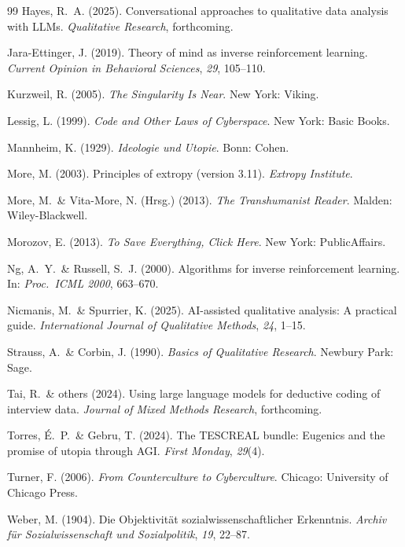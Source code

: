 \documentclass[12pt,a4paper]{article}
\begin{document}
\begin{thebibliography}{99}
  Hayes, R.~A. (2025).
  Conversational approaches to qualitative data analysis with LLMs.
  \textit{Qualitative Research}, forthcoming.

  Jara-Ettinger, J. (2019).
  Theory of mind as inverse reinforcement learning.
  \textit{Current Opinion in Behavioral Sciences}, \textit{29}, 105--110.

  Kurzweil, R. (2005).
  \textit{The Singularity Is Near}.
  New York: Viking.

  Lessig, L. (1999).
  \textit{Code and Other Laws of Cyberspace}.
  New York: Basic Books.

  Mannheim, K. (1929).
  \textit{Ideologie und Utopie}.
  Bonn: Cohen.

  More, M. (2003).
  Principles of extropy (version 3.11).
  \textit{Extropy Institute}.

  More, M.~\& Vita-More, N. (Hrsg.) (2013).
  \textit{The Transhumanist Reader}.
  Malden: Wiley-Blackwell.

  Morozov, E. (2013).
  \textit{To Save Everything, Click Here}.
  New York: PublicAffairs.

  Ng, A.~Y.~\& Russell, S.~J. (2000).
  Algorithms for inverse reinforcement learning.
  In: \textit{Proc.\ ICML 2000}, 663--670.

  Nicmanis, M.~\& Spurrier, K. (2025).
  AI-assisted qualitative analysis: A practical guide.
  \textit{International Journal of Qualitative Methods}, \textit{24}, 1--15.

  Strauss, A.~\& Corbin, J. (1990).
  \textit{Basics of Qualitative Research}.
  Newbury Park: Sage.

  Tai, R.~\& others (2024).
  Using large language models for deductive coding of interview data.
  \textit{Journal of Mixed Methods Research}, forthcoming.

  Torres, \'E.~P.~\& Gebru, T. (2024).
  The TESCREAL bundle: Eugenics and the promise of utopia through AGI.
  \textit{First Monday}, \textit{29}(4).

  Turner, F. (2006).
  \textit{From Counterculture to Cyberculture}.
  Chicago: University of Chicago Press.

  Weber, M. (1904).
  Die \glqq Objektivit\"at\grqq{} sozialwissenschaftlicher Erkenntnis.
  \textit{Archiv f\"ur Sozialwissenschaft und Sozialpolitik}, \textit{19}, 22--87.

\end{thebibliography}
\end{document}
